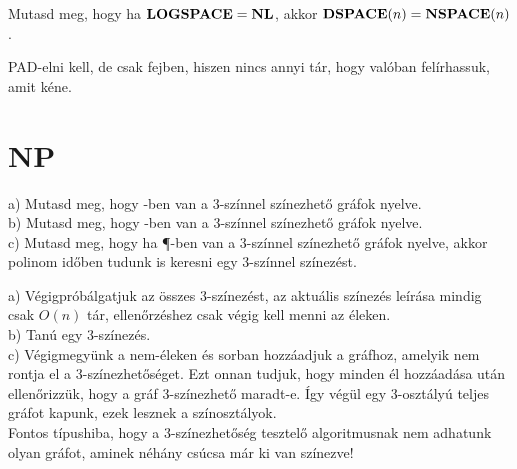 \begin{Exercise}[counter={sorszam}, difficulty=0]
	Mutasd meg, hogy ha $\mbox{\ensuremath{\mathbf{LOGSPACE}}}=\mbox{\ensuremath{\mathbf{NL}}}$, akkor $\mbox{\ensuremath{\mathbf{DSPACE}}}(n)=\mbox{\ensuremath{\mathbf{NSPACE}}}(n)$.
\end{Exercise}	
\begin{Answer}
	PAD-elni kell, de csak fejben, hiszen nincs annyi t\'ar, hogy val\'oban fel\'irhassuk, amit k\'ene.
\end{Answer} 















\chapter{NP}

\begin{Exercise}[counter={sorszam}, difficulty=0]
	a) Mutasd meg, hogy \PSPACE-ben van a $3$-sz\'innel sz\'inezhet\H o gr\'afok nyelve.\\
	b) Mutasd meg, hogy \NP-ben van a $3$-sz\'innel sz\'inezhet\H o gr\'afok nyelve.\\
	c) Mutasd meg, hogy ha \P-ben van a $3$-sz\'innel sz\'inezhet\H o gr\'afok nyelve, akkor polinom id\H oben tudunk is keresni egy $3$-sz\'innel sz\'inez\'est.	
\end{Exercise}	
\begin{Answer}
	a) V\'egigpr\'ob\'algatjuk az \"osszes $3$-sz\'inez\'est, az aktu\'alis sz\'inez\'es le\'ir\'asa mindig csak $O(n)$ t\'ar, ellen\H orz\'eshez csak v\'egig kell menni az \'eleken.\\
	b) Tan\'u egy $3$-sz\'inez\'es.\\
	c) V\'egigmegy\"unk a nem-\'eleken \'es sorban hozz\'aadjuk a gr\'afhoz, amelyik nem rontja el a $3$-sz\'inezhet\H os\'eget. Ezt onnan tudjuk, hogy minden \'el hozz\'aad\'asa ut\'an ellen\H orizz\"uk, hogy a gr\'af $3$-sz\'inezhet\H o maradt-e. \'Igy v\'eg\"ul egy $3$-oszt\'aly\'u teljes gr\'afot kapunk, ezek lesznek a sz\'inoszt\'alyok.\\
	Fontos t\'ipushiba, hogy a $3$-sz\'inezhet\H os\'eg tesztel\H o algoritmusnak nem adhatunk olyan gr\'afot, aminek n\'eh\'any cs\'ucsa m\'ar ki van sz\'inezve!
\end{Answer}




